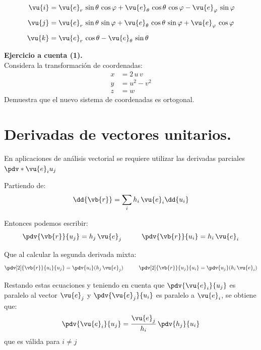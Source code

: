 \begin{align*}
\vu{i} &= \vu{e}_{r} \, \sin \theta \, \cos \varphi + \vu{e}_{\theta} \, \cos \theta \, \cos \varphi - \vu{e}_{\varphi} \, \sin \varphi \\[0.5em]
\vu{j} &= \vu{e}_{r} \, \sin \theta \, \sin \varphi + \vu{e}_{\theta} \, \cos \theta \, \sin \varphi + \vu{e}_{\varphi} \, \cos \varphi \\[0.5em]
\vu{k} &= \vu{e}_{r} \, \cos \theta - \vu{e}_{\theta} \, \sin \theta
\end{align*}
\par
\noindent
\textbf{Ejercicio a cuenta (1).}
\\
Considera la transformación de coordenadas:
\begin{align*}
x &= 2 \, u \, v \\[0.5em]
y &= u^{2} - v^{2} \\[0.5em]
z &= w
\end{align*}
Demuestra que el nuevo sistema de coordenadas es ortogonal.

\section{Derivadas de vectores unitarios.}

En aplicaciones de análisis vectorial se requiere utilizar las derivadas parciales $\pdv*{\vu{e}_{i}}{u_{j}}$
\par
Partiendo de:
\begin{align*}
\dd{\vb{r}} = \sum_{i} h_{i} \, \vu{e}_{i} \dd{u_{i}}
\end{align*}
\par
Entonces podemos escribir:
\begin{align*}
\pdv{\vb{r}}{u_{j}} = h_{j} \, \vu{e}_{j} \hspace{1cm} \pdv{\vb{r}}{u_{i}} = h_{i} \, \vu{e}_{i}
\end{align*}
\par
Que al calcular la segunda derivada mixta:
\begin{align*}
\pdv[2]{\vb{r}}{u_{i}}{u_{j}} = \pdv{u_{i}} (h_{j} \, \vu{e}_{j}) \hspace{1cm} \pdv[2]{\vb{r}}{u_{j}}{u_{i}} = \pdv{u_{j}} (h_{i} \, \vu{e}_{i})
\end{align*}

Restando estas ecuaciones y teniendo en cuenta que $\displaystyle \pdv{\vu{e}_{i}}{u_{j}}$ es paralelo al vector $\vu{e}_{j}$ y $\displaystyle \pdv{\vu{e}_{j}}{u_{i}}$ es paralelo a $\vu{e}_{i}$, se obtiene que:
\begin{align*}
\pdv{\vu{e}_{i}}{u_{j}} = \dfrac{\vu{e}_{j}}{h_{i}} \, \pdv{h_{j}}{u_{i}}
\end{align*}
que es válida para $i \neq j$

